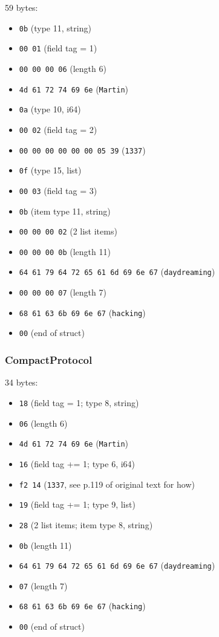 \documentclass[12pt, titlepage]{article}
\begin{document}
59 bytes:

\begin{itemize}
    \item \texttt{0b} (type 11, string)
    \item \texttt{00 01} (field tag = 1)
    \item \texttt{00 00 00 06} (length 6)
    \item \texttt{4d 61 72 74 69 6e} (\texttt{Martin})
    \item \texttt{0a} (type 10, i64)
    \item \texttt{00 02} (field tag = 2)
    \item \texttt{00 00 00 00 00 00 05 39} (\texttt{1337})
    \item \texttt{0f} (type 15, list)
    \item \texttt{00 03} (field tag = 3)
    \item \texttt{0b} (item type 11, string)
    \item \texttt{00 00 00 02} (2 list items)
    \item \texttt{00 00 00 0b} (length 11)
    \item \texttt{64 61 79 64 72 65 61 6d 69 6e 67} (\texttt{daydreaming})
    \item \texttt{00 00 00 07} (length 7)
    \item \texttt{68 61 63 6b 69 6e 67} (\texttt{hacking})
    \item \texttt{00} (end of struct)
\end{itemize}

\subsubsection{CompactProtocol}

34 bytes:

\begin{itemize}
    \item \texttt{18} (field tag = 1; type 8, string)
    \item \texttt{06} (length 6)
    \item \texttt{4d 61 72 74 69 6e} (\texttt{Martin})
    \item \texttt{16} (field tag += 1; type 6, i64)
    \item \texttt{f2 14} (\texttt{1337}, see p.119 of original text for how)
    \item \texttt{19} (field tag += 1; type 9, list)
    \item \texttt{28} (2 list items; item type 8, string)
    \item \texttt{0b} (length 11)
    \item \texttt{64 61 79 64 72 65 61 6d 69 6e 67} (\texttt{daydreaming})
    \item \texttt{07} (length 7)
    \item \texttt{68 61 63 6b 69 6e 67} (\texttt{hacking})
    \item \texttt{00} (end of struct)
\end{itemize}
\end{document}
